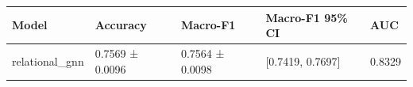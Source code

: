 \begin{tabular}{lllll}
\toprule
Model & Accuracy & Macro-F1 & Macro-F1 95\% CI & AUC \\
\midrule
relational\_gnn & 0.7569 ± 0.0096 & 0.7564 ± 0.0098 & [0.7419, 0.7697] & 0.8329 \\
\bottomrule
\end{tabular}
